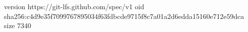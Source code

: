 version https://git-lfs.github.com/spec/v1
oid sha256:c4d9e35f7099767895034f63fdbcde9715f8c7a01a2d6edda15160e712e59dca
size 7340
